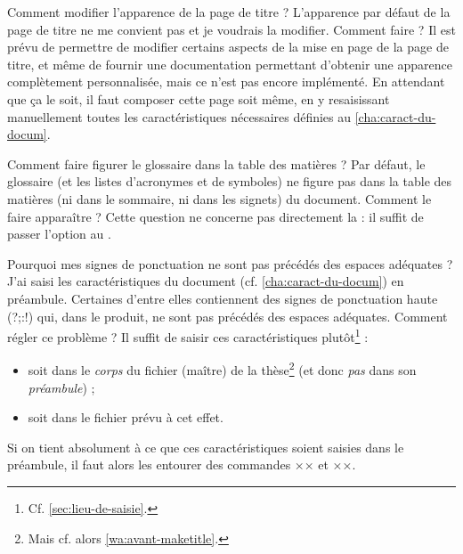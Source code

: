 \begin{dbfaq}{Comment modifier l'apparence de la page de titre ?}{}
  L'apparence par défaut de la page de titre ne me convient pas et je voudrais
  la modifier. Comment faire ?
  \tcblower
  Il est prévu de permettre de modifier certains aspects de la mise en page de
  la page de titre, et même de fournir une documentation permettant d'obtenir
  une apparence complètement personnalisée, mais ce n'est pas encore
  implémenté.  En attendant que ça le soit, il faut composer cette page soit
  même, en y resaisissant manuellement toutes les caractéristiques nécessaires
  définies au \vref{cha:caract-du-docum}.
\end{dbfaq}

\begin{dbfaq}{Comment faire figurer le glossaire dans la table des matières ?}{}
  Par défaut, le glossaire (et les listes d'acronymes et de symboles) ne figure
  pas dans la table des matières (ni dans le sommaire, ni dans les signets) du
  document. Comment le faire apparaître ?
  \tcblower
  Cette question ne concerne pas directement la \yatcl{} : il suffit de passer
  l'option  au .
\end{dbfaq}

\begin{dbfaq}{Pourquoi mes signes de ponctuation ne sont pas précédés
    des espaces adéquates ?}{}
  J'ai saisi les caractéristiques du document (cf. \vref{cha:caract-du-docum})
  en préambule. Certaines d'entre elles contiennent des signes de ponctuation
  haute ({\NoAutoSpacing?;:!}) qui, dans le \pdf produit, ne sont pas précédés
  des espaces adéquates. Comment régler ce problème ?
  \tcblower
  Il suffit de saisir ces caractéristiques
  plutôt\footnote{Cf. \vref{sec:lieu-de-saisie}.} :
  \begin{itemize}
  \item soit dans le \emph{corps} du fichier (maître) de la thèse\footnote{Mais
      cf. alors \vref{wa:avant-maketitle}.} (et donc \emph{pas} dans son
    \emph{préambule}) ;
  \item soit dans le fichier \file{\characteristicsfile} prévu à cet effet.
  \end{itemize}
  Si on tient absolument à ce que ces caractéristiques soient saisies dans le
  préambule, il faut alors les entourer des commandes ×× et
  ××.
\end{dbfaq}

